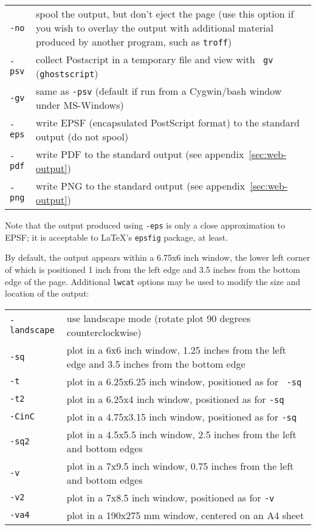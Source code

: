 \documentclass{book}
\begin{document}
\begin{tabular}{p{1in}p{3in}}
{\tt -no} & spool the output, but don't eject the page (use this
            option if you wish to overlay the output with additional
            material produced by another program, such as {\tt troff}) \\
{\tt -psv} & collect Postscript in a temporary file and view with {\tt
            gv} ({\tt ghostscript}) \\
{\tt -gv} & same as {\tt -psv} (default if run from a Cygwin/bash window
	    under MS-Windows) \\
{\tt -eps} & write EPSF (encapsulated PostScript format) to the standard output
	     (do not spool) \\
{\tt -pdf} & write PDF to the standard output
             (see appendix~\ref{sec:web-output}) \\
{\tt -png} & write PNG to the standard output
             (see appendix~\ref{sec:web-output}) \\
\end{tabular}

Note that the output produced using {\tt -eps} is only a close approximation to
EPSF;  it is acceptable to \LaTeX{}'s {\tt epsfig} package, at least.

By default, the output appears within a 6.75x6 inch window, the lower
left corner of which is positioned 1 inch from the left edge and 3.5 inches
from the bottom edge of the page.  Additional {\tt lwcat} options may be
used to modify the size and location of the output:

\begin{tabular}{p{1in}p{3in}}
{\tt -landscape} & use landscape mode (rotate plot 90 degrees
	counterclockwise) \\
{\tt -sq} & plot in a 6x6 inch window, 1.25 inches from the left edge and 3.5
	inches from the bottom edge \\
{\tt -t} & plot in a 6.25x6.25 inch window, positioned as for {\tt
	-sq} \\
{\tt -t2} & plot in a 6.25x4 inch window, positioned as for {\tt -sq} \\
{\tt -CinC} & plot in a 4.75x3.15 inch window, positioned as for {\tt -sq} \\
{\tt -sq2} & plot in a 4.5x5.5 inch window, 2.5 inches from the left and bottom
	edges \\
{\tt -v} & plot in a 7x9.5 inch window, 0.75 inches from the left and
	bottom edges \\
{\tt -v2} & plot in a 7x8.5 inch window, positioned as for {\tt -v} \\
{\tt -va4} & plot in a 190x275 mm window, centered on an A4 sheet
\end{tabular}
\end{document}
